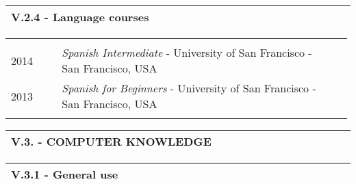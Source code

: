 \documentclass[11pt, letterpaper]{extarticle}
\begin{document}

	\label{sec:V.2.4.}
	\begin{longtable}{L{1.012\linewidth}N}
		\textbf{\large V.2.4 - Language courses} & \\[0.60cm] \hline
	\end{longtable}

	\begin{longtable}{C{0.154\linewidth}C{0.834\linewidth}N}
		                                                             &                                                                                                                                                                                                                                                  & \\[-0.12cm]
		2014                                                         & \textit{Spanish Intermediate} - University of San Francisco - San Francisco, USA                                                                                                                                                                 & \\[0.40cm]
		2013                                                         & \textit{Spanish for Beginners} - University of San Francisco - San Francisco, USA                                                                                                                                                                & \\[0.40cm]
		                                                             &                                                                                                                                                                                                                                                  & \\[-0.12cm] \hline
	\end{longtable}


	\label{sec:V.3.}
	\begin{longtable}{C{1.012\linewidth}N}
		\textbf{\large V.3. - COMPUTER KNOWLEDGE} & \\[0.70cm] \hline
	\end{longtable}


	\label{sec:V.3.1.}
	\begin{longtable}{L{1.012\linewidth}N}
		\textbf{\large V.3.1 - General use} & \\[0.60cm] \hline
	\end{longtable}
\end{document}

